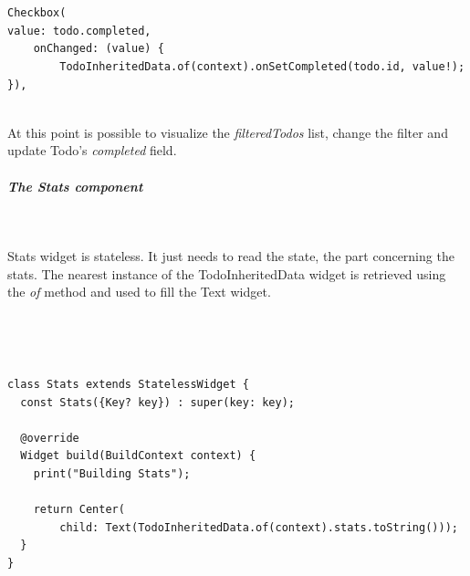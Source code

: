\mbox{}\\

\begin{code}

\mbox{}\\
\begin{verbatim}
Checkbox(
value: todo.completed,
    onChanged: (value) {
    	TodoInheritedData.of(context).onSetCompleted(todo.id, value!);
}),
\end{verbatim}
\end{code}
\mbox{}\\


At this point is possible to visualize the \textit{filteredTodos} list, change the filter and update Todo’s \textit{completed }field.


\subparagraph{The Stats component}\mbox{}\\
\label{subpar:todo_app_inherited_widget_stats_component}

Stats widget is stateless. It just needs to read the state, the part concerning the stats. The nearest instance of the TodoInheritedData widget is retrieved using the \textit{of} method and used to fill the Text widget.


\mbox{}\\


\mbox{}\\
\begin{code}
\begin{verbatim}
class Stats extends StatelessWidget {
  const Stats({Key? key}) : super(key: key);

  @override
  Widget build(BuildContext context) {
    print("Building Stats");

    return Center(
        child: Text(TodoInheritedData.of(context).stats.toString()));
  }
}
\end{verbatim}
\end{code}

